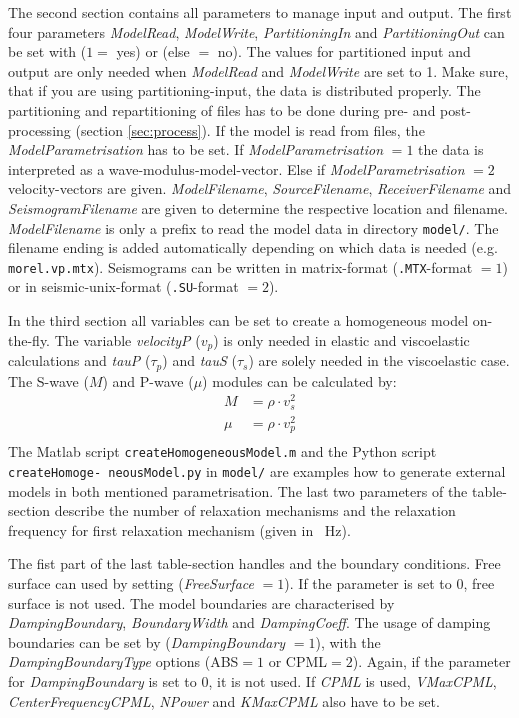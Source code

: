 \documentclass[pdftex,a4paper,parskip,listof=totoc,bibliography=totoc,onehalfspacing,12pt]{scrreprt}
\newcommand{\shellcmd}[1]{\indent\indent\texttt{#1}}	%
\begin{document}
The second section contains all parameters to manage input and output. The first four parameters \textit{ModelRead}, \textit{ModelWrite}, \textit{PartitioningIn} and  \textit{PartitioningOut} can be set with ($1=$ yes) or (else $=$ no). The values for partitioned input and output are only needed when \textit{ModelRead} and \textit{ModelWrite} are set to 1. Make sure, that if you are using partitioning-input, the data is distributed properly. The partitioning and repartitioning of files has to be done during pre- and post-processing (section \ref{sec:process}).
If the model is read from files, the \textit{ModelParametrisation} has to be set. If \textit{ModelParametrisation} $=1$ the data is interpreted as a wave-modulus-model-vector. Else if \textit{ModelParametrisation} $=2$ velocity-vectors are given.
\textit{ModelFilename}, \textit{SourceFilename}, \textit{ReceiverFilename} and  \textit{SeismogramFilename} are given to determine the respective location and filename. \textit{ModelFilename} is only a prefix to read the model data in directory \shellcmd{model/}. The filename ending is added automatically depending on which data is needed (e.g. \shellcmd{morel.vp.mtx}).
Seismograms can be written in matrix-format (\shellcmd{.MTX}-format $=1$) or in seismic-unix-format (\shellcmd{.SU}-format $=2$). 

In the third section all variables can be set to create a homogeneous model on-the-fly. The variable \textit{velocityP} ($v_p$) is only needed in elastic and viscoelastic calculations and  \textit{tauP} ($\tau_p$) and \textit{tauS} ($\tau_s$) are solely needed in the viscoelastic case. 
The S-wave ($M$) and P-wave ($\mu$) modules can be calculated by:
\begin{align*}
	M&=\rho\cdot v_s^2\\
	\mu &=\rho\cdot v_p^2\\
\end{align*}
The Matlab script \shellcmd{createHomogeneousModel.m} and the Python script \shellcmd{createHomoge- neousModel.py} in \shellcmd{model/} are examples how to generate external models in both mentioned parametrisation. 
The last two parameters of the table-section describe the number of relaxation mechanisms and the relaxation frequency for first relaxation mechanism (given in \SI{}{Hz}).

The fist part of the last table-section handles and the boundary conditions. Free surface can used by setting (\textit{FreeSurface} $=1$). If the parameter is set to 0, free surface is not used. 
The model boundaries are characterised by \textit{DampingBoundary}, \textit{BoundaryWidth} and \textit{DampingCoeff}. The usage of damping boundaries can be set by (\textit{DampingBoundary} $=1$), with the \textit{DampingBoundaryType} options (ABS$=1$ or CPML$=2$). Again, if the parameter for \textit{DampingBoundary} is set to 0, it is not used. 
If \textit{CPML} is used, \textit{VMaxCPML}, \textit{CenterFrequencyCPML}, \textit{NPower} and \textit{KMaxCPML} also have to be set. 
\end{document}
